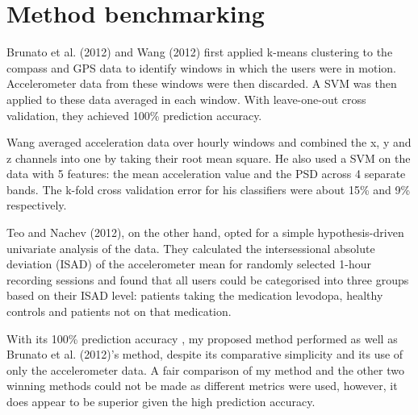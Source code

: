 \documentclass[8pt]{article}
\begin{document}

\section{Method benchmarking}
\label{sec:comparison}
Brunato et al. (2012) and Wang (2012) first applied k-means clustering to the compass and GPS data to identify windows in which the users were in motion. Accelerometer data from these windows were then discarded. A SVM was then applied to these data averaged in each window. With leave-one-out cross validation, they achieved 100\% prediction accuracy.

Wang averaged acceleration data over hourly windows and combined the x, y and z channels into one by taking their root mean square. He also used a SVM on the data with 5 features: the mean acceleration value and the PSD across 4 separate bands. The k-fold cross validation error for his classifiers were about 15\% and 9\% respectively.

Teo and Nachev (2012), on the other hand, opted for a simple hypothesis-driven univariate analysis of the data. They calculated the intersessional absolute deviation (ISAD) of the accelerometer mean for randomly selected 1-hour recording sessions and found that all users could be categorised into three groups based on their ISAD level: patients taking the medication levodopa, healthy controls and patients not on that medication.

With its 100\% prediction accuracy , my proposed method performed as well as Brunato et al. (2012)'s method, despite its comparative simplicity and its use of only the accelerometer data. A fair comparison of my method and the other two winning methods could not be made as different metrics were used, however, it does appear to be superior given the high prediction accuracy.
\end{document}
